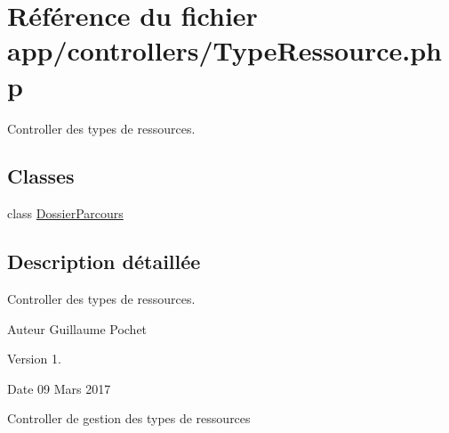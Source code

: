 \hypertarget{_type_ressource_8php}{}\section{Référence du fichier app/controllers/\+Type\+Ressource.php}
\label{_type_ressource_8php}


Controller des types de ressources.  


\subsection*{Classes}
\begin{DoxyCompactItemize}
\item 
class \hyperlink{class_dossier_parcours}{Dossier\+Parcours}
\end{DoxyCompactItemize}


\subsection{Description détaillée}
Controller des types de ressources. 

\begin{DoxyAuthor}{Auteur}
Guillaume Pochet 
\end{DoxyAuthor}
\begin{DoxyVersion}{Version}
1. 
\end{DoxyVersion}
\begin{DoxyDate}{Date}
09 Mars 2017
\end{DoxyDate}
Controller de gestion des types de ressources 
